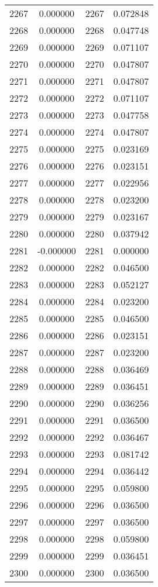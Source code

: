 \documentclass[12pt]{article}
\begin{document}
\begin{longtable}{@{}cccc@{}}
2267 & 0.000000 & 2267 & 0.072848 \\
2268 & 0.000000 & 2268 & 0.047748 \\
2269 & 0.000000 & 2269 & 0.071107 \\
2270 & 0.000000 & 2270 & 0.047807 \\
2271 & 0.000000 & 2271 & 0.047807 \\
2272 & 0.000000 & 2272 & 0.071107 \\
2273 & 0.000000 & 2273 & 0.047758 \\
2274 & 0.000000 & 2274 & 0.047807 \\
2275 & 0.000000 & 2275 & 0.023169 \\
2276 & 0.000000 & 2276 & 0.023151 \\
2277 & 0.000000 & 2277 & 0.022956 \\
2278 & 0.000000 & 2278 & 0.023200 \\
2279 & 0.000000 & 2279 & 0.023167 \\
2280 & 0.000000 & 2280 & 0.037942 \\
2281 & -0.000000 & 2281 & 0.000000 \\
2282 & 0.000000 & 2282 & 0.046500 \\
2283 & 0.000000 & 2283 & 0.052127 \\
2284 & 0.000000 & 2284 & 0.023200 \\
2285 & 0.000000 & 2285 & 0.046500 \\
2286 & 0.000000 & 2286 & 0.023151 \\
2287 & 0.000000 & 2287 & 0.023200 \\
2288 & 0.000000 & 2288 & 0.036469 \\
2289 & 0.000000 & 2289 & 0.036451 \\
2290 & 0.000000 & 2290 & 0.036256 \\
2291 & 0.000000 & 2291 & 0.036500 \\
2292 & 0.000000 & 2292 & 0.036467 \\
2293 & 0.000000 & 2293 & 0.081742 \\
2294 & 0.000000 & 2294 & 0.036442 \\
2295 & 0.000000 & 2295 & 0.059800 \\
2296 & 0.000000 & 2296 & 0.036500 \\
2297 & 0.000000 & 2297 & 0.036500 \\
2298 & 0.000000 & 2298 & 0.059800 \\
2299 & 0.000000 & 2299 & 0.036451 \\
2300 & 0.000000 & 2300 & 0.036500 \\

\end{longtable}
\end{document}
